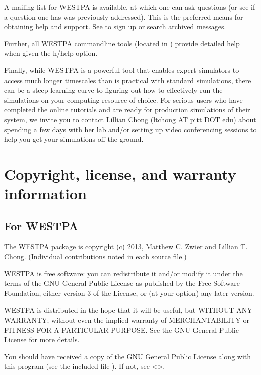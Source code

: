 \documentclass[letterpaper,10pt,english]{sphinxmanual}
\begin{document}
A mailing list for WESTPA is available, at which one can ask questions (or see
if a question one has was previously addressed). This is the preferred means
for obtaining help and support. See 
to sign up or search archived messages.

Further, all WESTPA command\sphinxhyphen{}line tools (located in ) provide detailed help when
given the \sphinxhyphen{}h/\textendash{}help option.

Finally, while WESTPA is a powerful tool that enables expert simulators to access much longer
timescales than is practical with standard simulations, there can be a steep learning curve to
figuring out how to effectively run the simulations on your computing resource of choice.
For serious users who have completed the online tutorials and are ready for production simulations
of their system, we invite you to contact Lillian Chong (ltchong AT pitt DOT edu) about spending
a few days with her lab and/or setting up video conferencing sessions to help you get your
simulations off the ground.


\chapter{Copyright, license, and warranty information}
\label{\detokenize{sphinx_index:copyright-license-and-warranty-information}}

\section{For WESTPA}
\label{\detokenize{sphinx_index:for-westpa}}
The WESTPA package is copyright (c) 2013, Matthew C. Zwier and
Lillian T. Chong. (Individual contributions noted in each source file.)

WESTPA is free software: you can redistribute it and/or modify
it under the terms of the GNU General Public License as published by
the Free Software Foundation, either version 3 of the License, or
(at your option) any later version.

WESTPA is distributed in the hope that it will be useful,
but WITHOUT ANY WARRANTY; without even the implied warranty of
MERCHANTABILITY or FITNESS FOR A PARTICULAR PURPOSE.  See the
GNU General Public License for more details.

You should have received a copy of the GNU General Public License
along with this program (see the included file ).  If not,
see \textless{}\textgreater{}.
\end{document}
